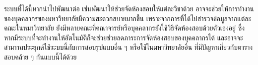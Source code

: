 ระบบที่ได้นี้หากนำไปพัฒนาต่อ เช่นพัฒนาให้ช่วยจัดห้องสอบให้แต่ละวิชาด้วย อาจจะช่วยให้การทำงานของบุคคลากรของมหาวิทยาลัยมีความสะดวกสบายมากขึ้น 
เพราะจากการที่ได้ไปสำรวจข้อมูลจากแต่ละคณะในหมาวิทยาลัย ยังมีหลายคณะที่คณาจารย์หรือบุคคลากรยังใช้วิธีจัดห้องสอบด้วยตัวเองอยู่ 
ซึ่งหากมีระบบที่จะทำงานให้อัตโนมัติก็จะช่วยช่วยลดภาระการจัดห้องสอบของบุคคลากรได้ และอาจจะสามารถประยุกต์ใช้ระบบนี้กับการสอบรูปแบบอื่น ๆ หรือใช้ในมหาวิทยาลัยอื่น ที่มีปัญหาเกี่ยวกับตารางสอบคล้าย ๆ กันแบบนี้ได้ด้วย
